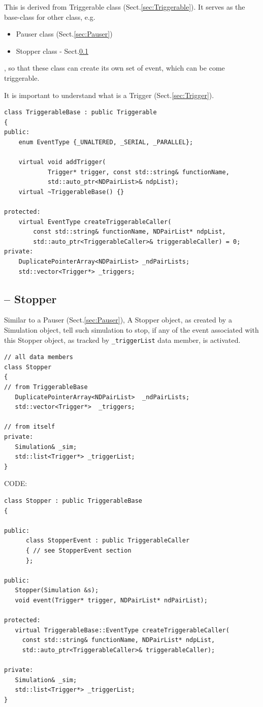 This is derived from Triggerable class (Sect.\ref{sec:Triggerable}).
It serves as the base-class for other class, e.g. 
\begin{itemize}
  \item Pauser class
(Sect.\ref{sec:Pauser})

  \item Stopper class - Sect.\ref{sec:Stopper}
\end{itemize}
, so that these class can create its own set of event, which can be come triggerable.

It is important to understand what is a Trigger (Sect.\ref{sec:Trigger}).

\begin{verbatim}
class TriggerableBase : public Triggerable
{
public:      
	enum EventType {_UNALTERED, _SERIAL, _PARALLEL};

	virtual void addTrigger(
			Trigger* trigger, const std::string& functionName, 
			std::auto_ptr<NDPairList>& ndpList);
	virtual ~TriggerableBase() {}

protected:
	virtual EventType createTriggerableCaller(
		const std::string& functionName, NDPairList* ndpList, 
		std::auto_ptr<TriggerableCaller>& triggerableCaller) = 0;
private:
	DuplicatePointerArray<NDPairList> _ndPairLists;
	std::vector<Trigger*> _triggers;
\end{verbatim}


\subsection{-- Stopper}
\label{sec:Stopper}

Similar to a Pauser (Sect.\ref{sec:Pauser}), A Stopper object, as created by a
Simulation object, tell such simulation to stop, if any of the event associated
with this Stopper object, as tracked by \verb!_triggerList! data member, is
activated.

\begin{verbatim}
// all data members
class Stopper
{
// from TriggerableBase
   DuplicatePointerArray<NDPairList>  _ndPairLists;
   std::vector<Trigger*>  _triggers;

// from itself
private:
   Simulation& _sim;
   std::list<Trigger*> _triggerList;
}
\end{verbatim}


CODE:

\begin{verbatim}
class Stopper : public TriggerableBase
{

public:
      class StopperEvent : public TriggerableCaller
      { // see StopperEvent section
      };

public:
   Stopper(Simulation &s);
   void event(Trigger* trigger, NDPairList* ndPairList);

protected:
   virtual TriggerableBase::EventType createTriggerableCaller(
	 const std::string& functionName, NDPairList* ndpList,
	 std::auto_ptr<TriggerableCaller>& triggerableCaller);

private:
   Simulation& _sim;
   std::list<Trigger*> _triggerList;
}
\end{verbatim}

